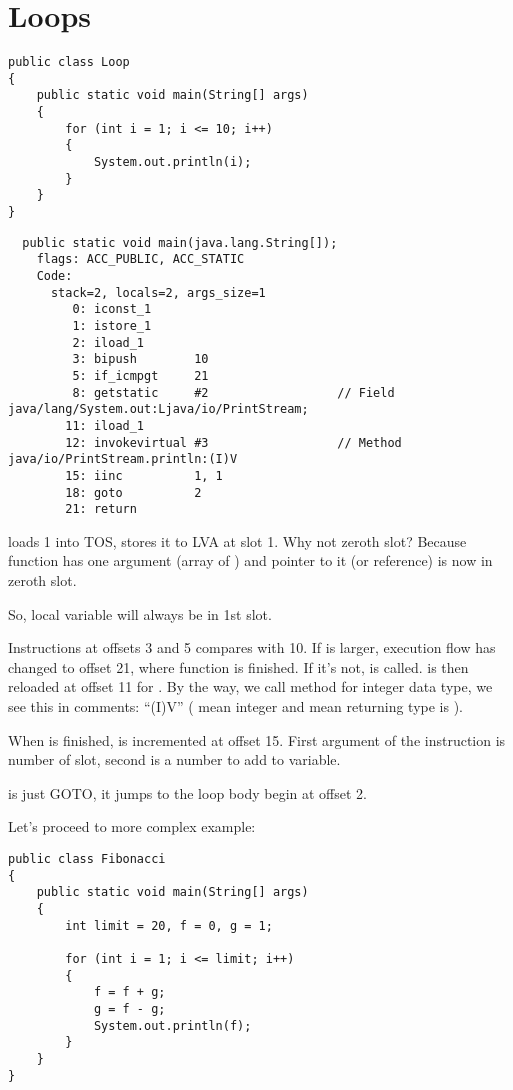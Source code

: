 \section{Loops}

\begin{lstlisting}
public class Loop
{
	public static void main(String[] args)
	{ 
		for (int i = 1; i <= 10; i++)
		{
			System.out.println(i); 
		}               
	}
}
\end{lstlisting}

\begin{lstlisting}
  public static void main(java.lang.String[]);
    flags: ACC_PUBLIC, ACC_STATIC
    Code:
      stack=2, locals=2, args_size=1
         0: iconst_1      
         1: istore_1      
         2: iload_1       
         3: bipush        10
         5: if_icmpgt     21
         8: getstatic     #2                  // Field java/lang/System.out:Ljava/io/PrintStream;
        11: iload_1       
        12: invokevirtual #3                  // Method java/io/PrintStream.println:(I)V
        15: iinc          1, 1
        18: goto          2
        21: return        
\end{lstlisting}

 loads 1 into \ac{TOS},  stores it to \ac{LVA} at slot 1.
Why not zeroth slot? Because  function has one argument (array of ) 
and pointer to it (or reference) is now in zeroth slot.

So,  local variable will always be in 1st slot.

Instructions at offsets 3 and 5 compares  with 10.
If  is larger, execution flow has changed to offset 21, where function is finished.
If it's not,  is called.  is then reloaded at offset 11 for .
By the way, we call  method for integer data type, we see this in comments: ``(I)V''
( mean integer and  mean returning type is ).

When  is finished,  is incremented at offset 15. 
First argument of the instruction is number of slot, second is a number to add to variable.

 is just GOTO, it jumps to the loop body begin at offset 2.

Let's proceed to more complex example:

\begin{lstlisting}
public class Fibonacci
{
	public static void main(String[] args)
	{ 
		int limit = 20, f = 0, g = 1;

		for (int i = 1; i <= limit; i++)
		{
			f = f + g;
			g = f - g;
			System.out.println(f); 
		}
	}
}
\end{lstlisting}

